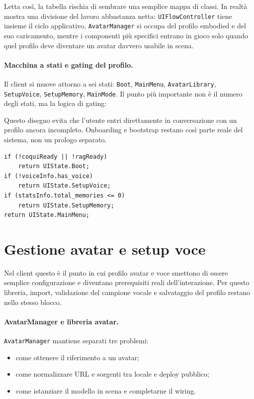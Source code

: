 Letta così, la tabella rischia di sembrare una semplice mappa di classi. In realtà mostra una divisione del lavoro abbastanza netta: \texttt{UIFlowController} tiene insieme il ciclo applicativo, \texttt{AvatarManager} si occupa del profilo embodied e del suo caricamento, mentre i componenti più specifici entrano in gioco solo quando quel profilo deve diventare un avatar davvero usabile in scena.

\paragraph{Macchina a stati e gating del profilo.}
Il client si muove attorno a sei stati: \texttt{Boot}, \texttt{MainMenu}, \texttt{AvatarLibrary}, \texttt{SetupVoice}, \texttt{SetupMemory}, \texttt{MainMode}. Il punto più importante non è il numero degli stati, ma la logica di gating:

Questo disegno evita che l'utente entri direttamente in conversazione con un profilo ancora incompleto. Onboarding e bootstrap restano così parte reale del sistema, non un prologo separato.

\begin{lstlisting}[style=sfcode,language={[Sharp]C},caption={Estratto adattato da \texttt{UIFlowController.cs}: scelta dello stato dopo i controlli di boot.}]
if (!coquiReady || !ragReady)
    return UIState.Boot;
if (!voiceInfo.has_voice)
    return UIState.SetupVoice;
if (statsInfo.total_memories <= 0)
    return UIState.SetupMemory;
return UIState.MainMenu;
\end{lstlisting}

\section{Gestione avatar e setup voce}
Nel client questo è il punto in cui profilo avatar e voce smettono di essere semplice configurazione e diventano prerequisiti reali dell'interazione. Per questo libreria, import, validazione del campione vocale e salvataggio del profilo restano nello stesso blocco.

\paragraph{AvatarManager e libreria avatar.}
\texttt{AvatarManager} mantiene separati tre problemi:
\begin{itemize}
\item come ottenere il riferimento a un avatar;
\item come normalizzare URL e sorgenti tra locale e deploy pubblico;
\item come istanziare il modello in scena e completarne il wiring.
\end{itemize}

